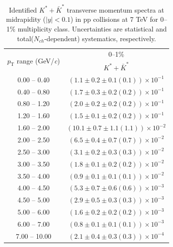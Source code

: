 \begin{table}
\caption{Identified $K^{*} + \bar{K}^{*}$ transverse momentum spectra at midrapidity ($|y|<0.1$) in pp collisions at 7 TeV for 0--1\% multiplicity class. Uncertainties are statistical and total($N_{ch}$-dependent) systematics, respectively.}
\label{tab:KStar_0to1}
\begin{center}
\begin{tabular}{ c | c }
\hline
\multirow{2}{*}{$p_{\mathrm{T}}$ range (GeV/\textit{c})} & \multicolumn{1}{c}{0--1\%} \\ & $K^{*} + \bar{K}^{*}$\\ 
\hline
0.00 -- 0.40 & $(1.1\pm0.2\pm0.1(0.1))\times10^{-1}$ \\ 
0.40 -- 0.80 & $(1.7\pm0.3\pm0.2(0.2))\times10^{-1}$ \\ 
0.80 -- 1.20 & $(2.0\pm0.2\pm0.2(0.2))\times10^{-1}$ \\ 
1.20 -- 1.60 & $(1.5\pm0.1\pm0.2(0.2))\times10^{-1}$ \\ 
1.60 -- 2.00 & $(10.1\pm0.7\pm1.1(1.1))\times10^{-2}$ \\ 
2.00 -- 2.50 & $(6.5\pm0.4\pm0.7(0.7))\times10^{-2}$ \\ 
2.50 -- 3.00 & $(3.1\pm0.2\pm0.3(0.3))\times10^{-2}$ \\ 
3.00 -- 3.50 & $(1.8\pm0.1\pm0.2(0.2))\times10^{-2}$ \\ 
3.50 -- 4.00 & $(0.9\pm0.1\pm0.1(0.1))\times10^{-2}$ \\ 
4.00 -- 4.50 & $(5.3\pm0.7\pm0.6(0.6))\times10^{-3}$ \\ 
4.50 -- 5.00 & $(2.9\pm0.5\pm0.3(0.3))\times10^{-3}$ \\ 
5.00 -- 6.00 & $(1.6\pm0.2\pm0.2(0.2))\times10^{-3}$ \\ 
6.00 -- 7.00 & $(0.8\pm0.1\pm0.1(0.1))\times10^{-3}$ \\ 
7.00 -- 10.00 & $(2.1\pm0.4\pm0.3(0.3))\times10^{-4}$ \\ 
\hline
\end{tabular}
\end{center}
\end{table}
 
